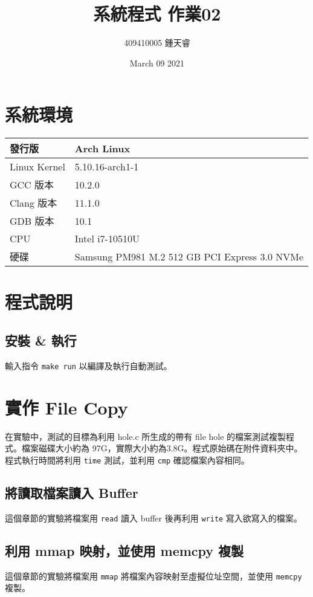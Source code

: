 \documentclass{ctexart}
\begin{document}
\pagestyle{headings}
\title{系統程式 作業02}
\author{409410005 鍾天睿}
\date{March 09 2021}
\maketitle
\clearpage

\section{系統環境}
\begin{center}
\begin{tabular}{ l l } 
\hline
發行版 & Arch Linux  \\
\hline
Linux Kernel & 5.10.16-arch1-1  \\
\hline
GCC 版本 & 10.2.0 \\
\hline
Clang 版本 & 11.1.0 \\
\hline
GDB 版本 & 10.1 \\
\hline
CPU & Intel i7-10510U \\
\hline
硬碟 & Samsung PM981 M.2 512 GB PCI Express 3.0 NVMe \\
\hline
\end{tabular}
\end{center}

\section{程式說明}
\subsection{安裝 \& 執行}
輸入指令 \texttt{make run} 以編譯及執行自動測試。
\section{實作 File Copy}
在實驗中，測試的目標為利用 hole.c 所生成的帶有 file hole 的檔案測試複製程式。檔案磁碟大小約為 97G，實際大小約為3.8G。程式原始碼在附件資料夾中。
程式執行時間將利用 \texttt{time} 測試，並利用 \texttt{cmp} 確認檔案內容相同。
\subsection{將讀取檔案讀入 Buffer}
這個章節的實驗將檔案用 \texttt{read} 讀入 buffer 後再利用 \texttt{write} 寫入欲寫入的檔案。
\subsection{利用 mmap 映射，並使用 memcpy 複製}
這個章節的實驗將檔案用 \texttt{mmap} 將檔案內容映射至虛擬位址空間，並使用 \texttt{memcpy} 複製。
\end{document}
